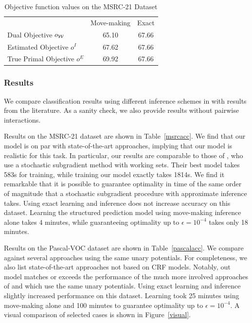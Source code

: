 \begin{table}
    \begin{center}
    \begin{tabular}{lcc}
    \toprule
                    & Move-making & Exact \\
    \cmidrule{1-3}
    Dual Objective $o_{\mathcal{W}}$ & 65.10 & 67.66  \\
    Estimated Objective $o^I$ &  67.62& 67.66\\
    True Primal Objective $o^E$& 69.92& 67.66\\
    \bottomrule
    \end{tabular}
    \end{center}
    \caption{Objective function values on the MSRC-21 Dataset}
    \label{msrc_objective}
\end{table}

\subsubsection{Results}
We compare classification results using different inference schemes in
with results from the literature. As a sanity check, we
also provide results without pairwise interactions.

Results on the MSRC-21 dataset are shown in Table~\ref{msrcacc}.
We find that our model is on par with state-of-the-art approaches, implying
that our model is realistic for this task. In particular, our results are comparable to those of
\citet{lucchi2013learning}, who use a stochastic subgradient method with working sets.
Their best model takes 583s for training, while training our model exactly takes 1814s.
We find it remarkable that it is possible to guarantee optimality in time of
the same order of magnitude that a stochastic subgradient procedure with
approximate inference takes. Using exact learning and inference does not increase accuracy
on this dataset.
Learning the structured prediction model using move-making inference alone
takes 4 minutes, while guaranteeing optimality up to  $\epsilon=10^{-4}$
takes only 18 minutes.

Results on the Pascal-VOC dataset are shown in Table~\ref{pascalacc}.
We compare against several approaches using the same unary potentials.
For completeness, we also list state-of-the-art approaches not based on CRF models.
Notably, out model matches or exceeds the performance of the much more involved approaches of
\citet{krahenbuhl2012efficient} and \citet{dann2012pottics} which use the same
unary potentials.
Using exact learning and inference slightly increased performance on this dataset.
Learning took 25 minutes using move-making alone and 100 minutes to guarantee optimality
up to $\epsilon=10^{-4}$.
A visual comparison of selected cases is shown in Figure~\ref{visual}.


